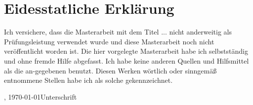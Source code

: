 
\chapter*{Eidesstatliche Erklärung}
\label{sec:EidesstatlicheErklärung}

Ich versichere, dass die Masterarbeit mit dem Titel \glqq{}...\grqq{} nicht anderweitig als Prüfungsleistung verwendet wurde und diese Masterarbeit noch nicht veröffentlicht worden ist. Die hier vorgelegte Masterarbeit habe ich selbstständig und ohne fremde Hilfe abgefasst. Ich habe keine anderen Quellen und Hilfsmittel als die an-gegebenen benutzt. Diesen Werken wörtlich oder sinngemäß entnommene Stellen habe ich als solche gekennzeichnet.
\vfill

\begin{center}
\begin{minipage}{0.9\textwidth}
\ort, \today \hfill  Unterschrift
\end{minipage}
\end{center}



